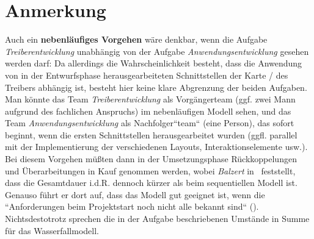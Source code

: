 \section*{Anmerkung}
Auch ein \textbf{nebenläufiges Vorgehen}  wäre denkbar, wenn die Aufgabe \textit{Treiberentwicklung} unabhängig von der Aufgabe \textit{Anwendungsentwicklung} gesehen werden darf: Da allerdings die Wahrscheinlichkeit besteht, dass die Anwendung von in der Entwurfsphase herausgearbeiteten Schnittstellen der Karte / des Treibers abhängig ist, besteht hier keine klare Abgrenzung der beiden Aufgaben.\\
Man könnte das Team \textit{Treiberentwicklung} als Vorgängerteam (ggf. zwei Mann aufgrund des fachlichen Anspruchs) im nebenläufigen Modell sehen, und das Team \textit{Anwendungsentwicklung} als Nachfolger``team`` (eine Person), das sofort beginnt, wenn die ersten Schnittstellen herausgearbeitet wurden (ggfl. parallel mit der Implementierung der verschiedenen Layouts, Interaktionselemente usw.).\\
Bei diesem Vorgehen müßten dann in der Umsetzungsphase Rückkoppelungen und Überarbeitungen in Kauf genommen werden, wobei
\textit{Balzert} in~\cite[522]{Bal08} feststellt, dass die Gesamtdauer i.d.R. dennoch kürzer als beim sequentiellen Modell ist.
Genauso führt er dort auf, dass das Modell gut geeignet ist, wenn die ``Anforderungen beim Projektstart noch nicht alle bekannt sind`` (\cite[524]{Bal08}). \\
Nichtsdestotrotz sprechen die in der Aufgabe beschriebenen Umstände in Summe für das Wasserfallmodell.

